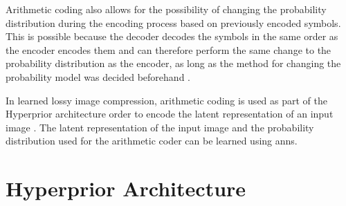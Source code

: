 Arithmetic coding also allows for the possibility of changing the probability distribution during the encoding process based on previously encoded symbols. This is possible because the decoder decodes the symbols in the same order as the encoder encodes them and can therefore perform the same change to the probability distribution as the encoder, as long as the method for changing the probability model was decided beforehand \citep{said_introduction_2023}.

In learned lossy image compression, arithmetic coding is used as part of the Hyperprior architecture order to encode the latent representation of an input image \citep{balle_end--end_2017}\citep{minnen_joint_2018}\citep{balle_variational_2018}. The latent representation of the input image and the probability distribution used for the arithmetic coder can be learned using \acp{ann}.

\section{Hyperprior Architecture}